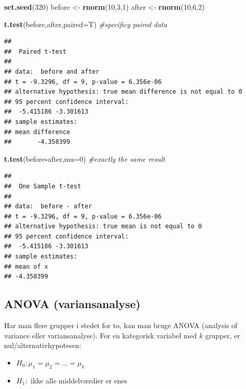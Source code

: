 \documentclass[
]{book}
\newenvironment{Shaded}{\begin{snugshade}}{\end{snugshade}}
\newcommand{\AttributeTok}[1]{\textcolor[rgb]{0.13,0.29,0.53}{#1}}
\newcommand{\CommentTok}[1]{\textcolor[rgb]{0.56,0.35,0.01}{\textit{#1}}}
\newcommand{\DecValTok}[1]{\textcolor[rgb]{0.00,0.00,0.81}{#1}}
\newcommand{\FunctionTok}[1]{\textcolor[rgb]{0.13,0.29,0.53}{\textbf{#1}}}
\newcommand{\NormalTok}[1]{#1}
\newcommand{\OtherTok}[1]{\textcolor[rgb]{0.56,0.35,0.01}{#1}}
\newcommand{\SpecialCharTok}[1]{\textcolor[rgb]{0.81,0.36,0.00}{\textbf{#1}}}
\providecommand{\tightlist}{%
  \setlength{\itemsep}{0pt}\setlength{\parskip}{0pt}}
\begin{document}
\begin{Shaded}
\begin{Highlighting}[]
\FunctionTok{set.seed}\NormalTok{(}\DecValTok{320}\NormalTok{)}
\NormalTok{before }\OtherTok{\textless{}{-}} \FunctionTok{rnorm}\NormalTok{(}\DecValTok{10}\NormalTok{,}\DecValTok{3}\NormalTok{,}\DecValTok{1}\NormalTok{)}
\NormalTok{after }\OtherTok{\textless{}{-}} \FunctionTok{rnorm}\NormalTok{(}\DecValTok{10}\NormalTok{,}\DecValTok{6}\NormalTok{,}\DecValTok{2}\NormalTok{)}

\FunctionTok{t.test}\NormalTok{(before,after,}\AttributeTok{paired=}\NormalTok{T) }\CommentTok{\#specificy paired data}
\end{Highlighting}
\end{Shaded}

\begin{verbatim}
## 
##  Paired t-test
## 
## data:  before and after
## t = -9.3296, df = 9, p-value = 6.356e-06
## alternative hypothesis: true mean difference is not equal to 0
## 95 percent confidence interval:
##  -5.415186 -3.301613
## sample estimates:
## mean difference 
##       -4.358399
\end{verbatim}

\begin{Shaded}
\begin{Highlighting}[]
\FunctionTok{t.test}\NormalTok{(before}\SpecialCharTok{{-}}\NormalTok{after,}\AttributeTok{mu=}\DecValTok{0}\NormalTok{) }\CommentTok{\#exactly the same result}
\end{Highlighting}
\end{Shaded}

\begin{verbatim}
## 
##  One Sample t-test
## 
## data:  before - after
## t = -9.3296, df = 9, p-value = 6.356e-06
## alternative hypothesis: true mean is not equal to 0
## 95 percent confidence interval:
##  -5.415186 -3.301613
## sample estimates:
## mean of x 
## -4.358399
\end{verbatim}

\subsection{ANOVA (variansanalyse)}\label{anova-variansanalyse}

Har man flere grupper i stedet for to, kan man bruge ANOVA (analysis of variance eller variansanalyse). For en kategorisk variabel med \(k\) grupper, er nul/alternativhypotesen:

\begin{itemize}
\tightlist
\item
  \(H_{0}: \mu_{1} = \mu_{2} = \ldots = \mu_{k}\)
\item
  \(H_{1}:\) ikke alle middelværdier er enes
\end{itemize}
\end{document}
